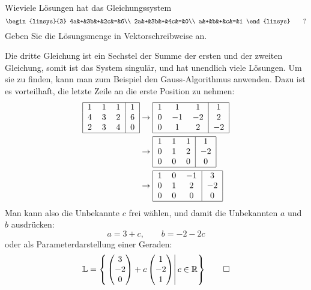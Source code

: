 Wieviele Lösungen hat das Gleichungssystem
\[
\begin{linsys}{3}
4a&+&3b&+&2c&=&6\\
2a&+&3b&+&4c&=&0\\
a&+&b&+&c&=&1
\end{linsys}
\qquad
?
\]
Geben Sie die Lösungsmenge in Vektorschreibweise an.

\begin{loesung}
Die dritte Gleichung ist ein Sechstel der Summe der ersten und der
zweiten Gleichung, somit ist das System singulär, und hat unendlich
viele Lösungen. Um sie zu finden, kann man zum Beispiel den Gauss-Algorithmus
anwenden. Dazu ist es vorteilhaft, die letzte Zeile an die erste
Position zu nehmen:
\begin{align*}
\begin{tabular}{|ccc|c|}
\hline
1&1&1&1\\
4&3&2&6\\
2&3&4&0\\
\hline
\end{tabular}
&
\rightarrow
\begin{tabular}{|ccc|c|}
\hline
1&1&1&1\\
0&$-1$&$-2$&2\\
0&1&2&$-2$\\
\hline
\end{tabular}
\\
&
\rightarrow
\begin{tabular}{|ccc|c|}
\hline
1&1&1&1\\
0&1&2&$-2$\\
0&0&0&0\\
\hline
\end{tabular}
\\
&
\rightarrow
\begin{tabular}{|ccc|c|}
\hline
1&0&$-1$&3\\
0&1&2&$-2$\\
0&0&0&0\\
\hline
\end{tabular}
\end{align*}
Man kann also die Unbekannte $c$ frei wählen, und damit die Unbekannten
$a$ und $b$ ausdrücken:
\[
a=3+c,\qquad b=-2-2c
\]
oder als Parameterdarstellung einer Geraden:
\[
\mathbb L =\left\{\left.
\begin{pmatrix}
3\\-2\\0
\end{pmatrix}
+c\begin{pmatrix}
1\\-2\\1
\end{pmatrix}\right | c\in \mathbb R
\right\}
\qedhere
\]
\end{loesung}

